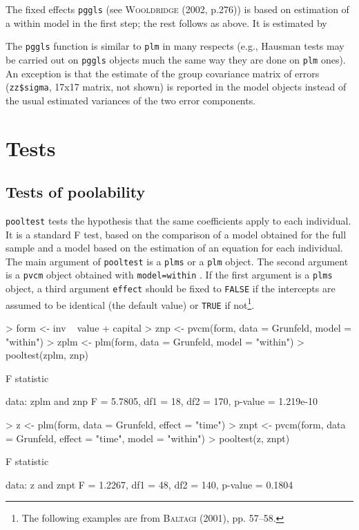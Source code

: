 \documentclass[a4paper]{article}
\begin{document}
The fixed effects \texttt{pggls} (see \textsc{Wooldridge} (2002, p.276)) is based on estimation of a within model in the first step; the rest follows as above. It is estimated by


The \texttt{pggls} function is similar to \texttt{plm} in many respects (e.g., Hausman tests may be carried out on \texttt{pggls} objects much the same way they are done on \texttt{plm} ones). An exception is that the estimate of the group covariance matrix of errors (\verb!zz$sigma!, 17x17 matrix, not shown) is reported in the model objects instead of the usual estimated variances of the two error components.

\section{Tests}


\subsection{Tests of poolability}

\texttt{pooltest} tests the hypothesis that the same coefficients
apply to each individual. It is a standard F test, based on the
comparison of a model obtained for the full sample and a model based
on the estimation of an equation for each individual. The main
argument of \texttt{pooltest} is a \texttt{plms} or a \texttt{plm} object. 
The second argument is a \texttt{pvcm} object obtained with \texttt{model=within} .
If the first argument is a \texttt{plms} object, 
a third argument  \texttt{effect} should be fixed to \texttt{FALSE} if
the intercepts are assumed to be identical (the default value) or \texttt{TRUE} if
not\footnote{The following examples are from 
  \textsc{Baltagi} (2001), pp. 57--58.}.

\begin{Schunk}
\begin{Sinput}
> form <- inv ~ value + capital
> znp <- pvcm(form, data = Grunfeld, model = "within")
> zplm <- plm(form, data = Grunfeld, model = "within")
> pooltest(zplm, znp)
\end{Sinput}
\begin{Soutput}
	F statistic

data:  zplm and znp 
F = 5.7805, df1 = 18, df2 = 170, p-value = 1.219e-10
\end{Soutput}
\begin{Sinput}
> z <- plm(form, data = Grunfeld, effect = "time")
> znpt <- pvcm(form, data = Grunfeld, effect = "time", model = "within")
> pooltest(z, znpt)
\end{Sinput}
\begin{Soutput}
	F statistic

data:  z and znpt 
F = 1.2267, df1 = 48, df2 = 140, p-value = 0.1804
\end{Soutput}
\end{Schunk}
\end{document}
